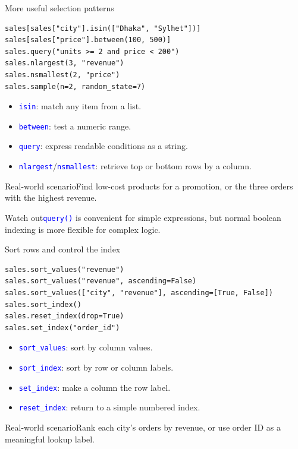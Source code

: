 \documentclass[aspectratio=169,10pt]{beamer}
\newcommand{\scenario}[1]{\begin{block}{Real-world scenario}#1\end{block}}
\newcommand{\pitfall}[1]{\begin{alertblock}{Watch out}#1\end{alertblock}}
\newcommand{\method}[1]{\texttt{\textcolor{Blue}{#1}}}
\begin{document}
\begin{frame}[fragile]{More useful selection patterns}
\begin{lstlisting}
sales[sales["city"].isin(["Dhaka", "Sylhet"])]
sales[sales["price"].between(100, 500)]
sales.query("units >= 2 and price < 200")
sales.nlargest(3, "revenue")
sales.nsmallest(2, "price")
sales.sample(n=2, random_state=7)
\end{lstlisting}
\begin{itemize}
\item \method{isin}: match any item from a list.
\item \method{between}: test a numeric range.
\item \method{query}: express readable conditions as a string.
\item \method{nlargest}/\method{nsmallest}: retrieve top or bottom rows by a column.
\end{itemize}
\scenario{Find low-cost products for a promotion, or the three orders with the highest revenue.}
\pitfall{\method{query()} is convenient for simple expressions, but normal boolean indexing is more flexible for complex logic.}
\end{frame}

\begin{frame}[fragile]{Sort rows and control the index}
\begin{lstlisting}
sales.sort_values("revenue")
sales.sort_values("revenue", ascending=False)
sales.sort_values(["city", "revenue"], ascending=[True, False])
sales.sort_index()
sales.reset_index(drop=True)
sales.set_index("order_id")
\end{lstlisting}
\begin{itemize}
\item \method{sort\_values}: sort by column values.
\item \method{sort\_index}: sort by row or column labels.
\item \method{set\_index}: make a column the row label.
\item \method{reset\_index}: return to a simple numbered index.
\end{itemize}
\scenario{Rank each city's orders by revenue, or use order ID as a meaningful lookup label.}
\end{frame}
\end{document}
